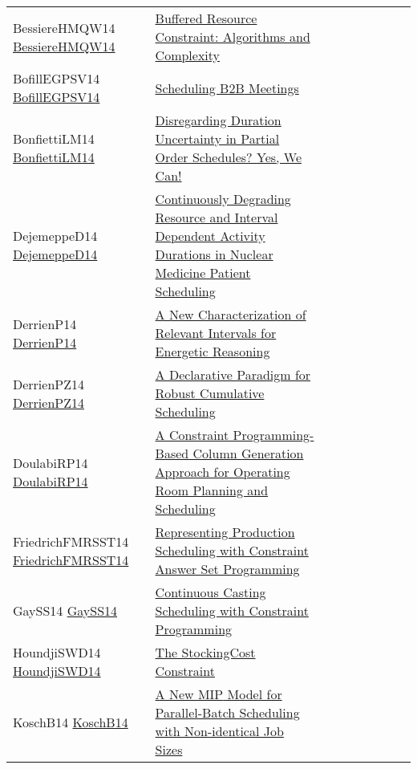 {\begin{longtable}{p{3cm}p{7cm}lllllll}
BessiereHMQW14 \href{https://doi.org/10.1007/978-3-319-07046-9\_23}{BessiereHMQW14} &  \href{papers/BessiereHMQW14.pdf}{Buffered Resource Constraint: Algorithms and Complexity} &  &  &  &  &  &  & \\
BofillEGPSV14 \href{https://doi.org/10.1007/978-3-319-10428-7\_56}{BofillEGPSV14} &  \href{papers/BofillEGPSV14.pdf}{Scheduling {B2B} Meetings} &  &  &  &  &  &  & \\
BonfiettiLM14 \href{https://doi.org/10.1007/978-3-319-07046-9\_15}{BonfiettiLM14} &  \href{papers/BonfiettiLM14.pdf}{Disregarding Duration Uncertainty in Partial Order Schedules? Yes, We Can!} &  &  &  &  &  &  & \\
DejemeppeD14 \href{https://doi.org/10.1007/978-3-319-07046-9\_20}{DejemeppeD14} &  \href{papers/DejemeppeD14.pdf}{Continuously Degrading Resource and Interval Dependent Activity Durations in Nuclear Medicine Patient Scheduling} &  &  &  &  &  &  & \\
DerrienP14 \href{https://doi.org/10.1007/978-3-319-10428-7\_22}{DerrienP14} &  \href{papers/DerrienP14.pdf}{A New Characterization of Relevant Intervals for Energetic Reasoning} &  &  &  &  &  &  & \\
DerrienPZ14 \href{https://doi.org/10.1007/978-3-319-10428-7\_23}{DerrienPZ14} &  \href{papers/DerrienPZ14.pdf}{A Declarative Paradigm for Robust Cumulative Scheduling} &  &  &  &  &  &  & \\
DoulabiRP14 \href{https://doi.org/10.1007/978-3-319-07046-9\_32}{DoulabiRP14} &  \href{papers/DoulabiRP14.pdf}{A Constraint Programming-Based Column Generation Approach for Operating Room Planning and Scheduling} &  &  &  &  &  &  & \\
FriedrichFMRSST14 \href{https://doi.org/10.1007/978-3-319-28697-6\_23}{FriedrichFMRSST14} &  \href{}{Representing Production Scheduling with Constraint Answer Set Programming} &  &  &  &  &  &  & \\
GaySS14 \href{https://doi.org/10.1007/978-3-319-10428-7\_59}{GaySS14} &  \href{papers/GaySS14.pdf}{Continuous Casting Scheduling with Constraint Programming} &  &  &  &  &  &  & \\
HoundjiSWD14 \href{https://doi.org/10.1007/978-3-319-10428-7\_29}{HoundjiSWD14} &  \href{papers/HoundjiSWD14.pdf}{The StockingCost Constraint} &  &  &  &  &  &  & \\
KoschB14 \href{https://doi.org/10.1007/978-3-319-07046-9\_5}{KoschB14} &  \href{papers/KoschB14.pdf}{A New {MIP} Model for Parallel-Batch Scheduling with Non-identical Job Sizes} &  &  &  &  &  &  & \\

\end{longtable}}
